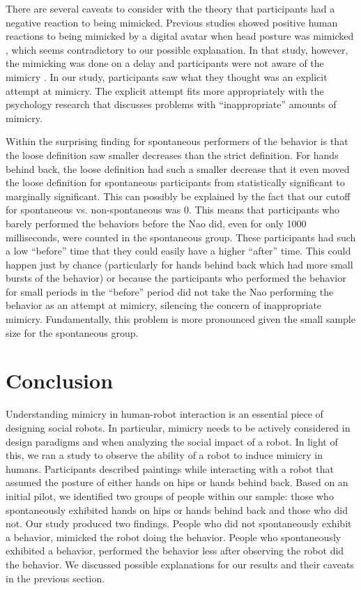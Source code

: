 \documentclass{acm_proc_article-sp}
\begin{document}
There are several caveats to consider with the theory that participants had a negative reaction to being mimicked. Previous studies showed positive human reactions to being mimicked by a digital avatar when head posture was mimicked \cite{bailenson2005digital}, which seems contradictory to our possible explanation. In that study, however, the mimicking was done on a delay and participants were not aware of the mimicry \cite{bailenson2005digital}. In our study, participants saw what they thought was an explicit attempt at mimicry. The explicit attempt fits more appropriately with the psychology research that discusses problems with ``inappropriate'' amounts of mimicry.

Within the surprising finding for spontaneous performers of the behavior is that the loose definition saw smaller decreases than the strict definition. For hands behind back, the loose definition had such a smaller decrease that it even moved the loose definition for spontaneous participants from statistically significant to marginally significant. This can possibly be explained by the fact that our cutoff for spontaneous vs. non-spontaneous was 0. This means that participants who barely performed the behaviors before the Nao did, even for only 1000 milliseconds, were counted in the spontaneous group. These participants had such a low ``before'' time that they could easily have a higher ``after'' time. This could happen just by chance (particularly for hands behind back which had more small bursts of the behavior) or because the participants who performed the behavior for small periods in the ``before'' period did not take the Nao performing the behavior as an attempt at mimicry, silencing the concern of inappropriate mimicry. Fundamentally, this problem is more pronounced given the small sample size for the spontaneous group.

\section{Conclusion}
Understanding mimicry in human-robot interaction is an essential piece of designing social robots. In particular, mimicry needs to be actively considered in design paradigms and when analyzing the social impact of a robot. In light of this, we ran a study to observe the ability of a robot to induce mimicry in humans. Participants described paintings while interacting with a robot that assumed the posture of either hands on hips or hands behind back. Based on an initial pilot, we identified two groups of people within our sample: those who spontaneously exhibited hands on hips or hands behind back and those who did not. Our study produced two findings. People who did not spontaneously exhibit a behavior, mimicked the robot doing the behavior. People who spontaneously exhibited a behavior, performed the behavior less after observing the robot did the behavior. We discussed possible explanations for our results and their caveats in the previous section.
\end{document}
